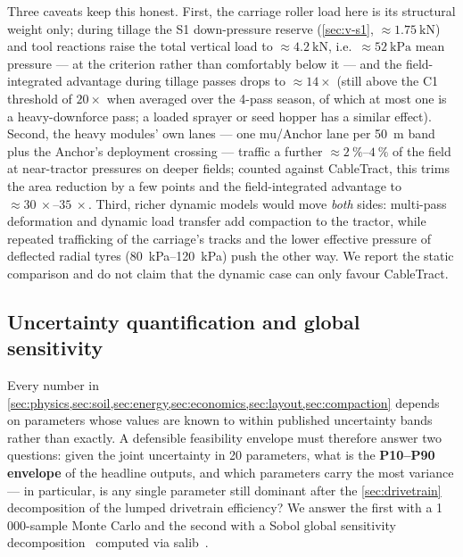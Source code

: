 \documentclass[11pt,a4paper]{article}
\begin{document}
Three caveats keep this honest. First, the carriage roller load here is its structural weight only; during tillage the S1 down-pressure reserve (\cref{sec:v-s1}, ${\approx}\SI{1.75}{\kilo\newton}$) and tool reactions raise the total vertical load to ${\approx}\SI{4.2}{\kilo\newton}$, i.e.\ ${\approx}\SI{52}{\kilo\pascal}$ mean pressure --- at the criterion rather than comfortably below it --- and the field-integrated advantage during tillage passes drops to ${\approx}14\times$ (still above the C1 threshold of $20\times$ when averaged over the 4-pass season, of which at most one is a heavy-downforce pass; a loaded sprayer or seed hopper has a similar effect). Second, the heavy modules' own lanes --- one \gls{mu}/Anchor lane per \SI{50}{\meter} band plus the Anchor's deployment crossing --- traffic a further ${\approx}\SIrange{2}{4}{\percent}$ of the field at near-tractor pressures on deeper fields; counted against CableTract, this trims the area reduction by a few points and the field-integrated advantage to ${\approx}\SIrange{30}{35}{\times}$. Third, richer dynamic models would move \emph{both} sides: multi-pass deformation and dynamic load transfer add compaction to the tractor, while repeated trafficking of the carriage's tracks and the lower effective pressure of deflected radial tyres (\SIrange{80}{120}{\kilo\pascal}) push the other way. We report the static comparison and do not claim that the dynamic case can only favour CableTract.

\subsection{Uncertainty quantification and global sensitivity}\label{sec:uq}

Every number in \cref{sec:physics,sec:soil,sec:energy,sec:economics,sec:layout,sec:compaction} depends on parameters whose values are known to within published uncertainty bands rather than exactly. A defensible feasibility envelope must therefore answer two questions: given the joint uncertainty in 20 parameters, what is the \textbf{P10--P90 envelope} of the headline outputs, and which parameters carry the most variance --- in particular, is any single parameter still dominant after the \cref{sec:drivetrain} decomposition of the lumped drivetrain efficiency? We answer the first with a 1\,000-sample Monte Carlo and the second with a Sobol global sensitivity decomposition~\cite{sobol2001indices,saltelli2008primer} computed via \gls{salib}~\cite{herman2017salib,iwanaga2022salib}.
\end{document}
